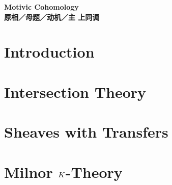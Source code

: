 \documentclass{note}
\begin{document}
\setcounter{section}{-1}
\begin{center}{\huge\bf Motivic Cohomology}\\
	{\Large\bf 原相／母题／动机／主 上同调}
\end{center}
\section{Introduction}
% 

\section{Intersection Theory}
% 

\section{Sheaves with Transfers}


\section{\texorpdfstring{Milnor $\relax{K}$-Theory}{Milnor 𝒦-Theory}}

\end{document}

